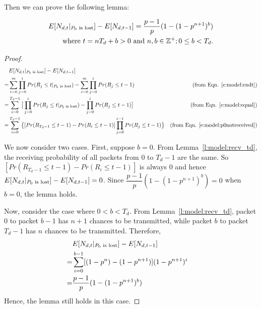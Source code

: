     Then we can prove the following lemma:
    \begin{lemma}
    \label{l:model:p0lost}
    \begin{eqnarray*}
    E[N_{d,t}|_{\textrm{$P_0$ is lost}}] - E[N_{d,t-1}] = \dfrac{p-1}{p}(1-(1-p^{n+1})^b) \\
    \textrm{where $t = nT_{d}+b > 0$ and $n,b \in\mathbb{Z^+}; 0 \le b<T_d$.}
    \end{eqnarray*}
    \end{lemma}
    \begin{proof}
    \begin{align*}
     &E[N_{d,t}|_{\textrm{$P_0$ is lost}}] - E[N_{d,t-1}] & \\
    =& \sum_{i=0}^{m}\prod_{j=0}^{i}Pr(R_{j} \le t|_{\textrm{$P_0$ is lost}}) - \sum_{i=0}^{m}\prod_{j=0}^{i}Pr(R_{j} \le t-1) & 
        \text{(from Eqn. \ref{e:model:endt})} \\
    =& \sum_{i=0}^{T_d - 1}\big[\prod_{j=0}^{i}Pr(R_{j} \le t|_{\textrm{$P_0$ is lost}}) - \prod_{j=0}^{i}Pr(R_{j} \le t-1)\big] &
        \text{(from Eqn. \ref{e:model:equal})}\\
    =& \sum_{i=0}^{T_d - 1}\big\{[Pr(R_{T_d-1} \le t-1) - Pr(R_{i} \le t-1)]\prod_{j=0}^{i-1}Pr(R_{j} \le t-1)\big\} 
        & \text{(from Eqn. \ref{e:model:p0notreceived})}\\
    \end{align*}

    We now consider two cases.  First, suppose $b = 0$.  From Lemma~\ref{l:model:recv_td}, the receiving probability of 
    all packets from 0 to $T_d - 1$ are the same. So $[Pr(R_{T_d-1} \leq t-1)
    - Pr(R_i \leq t-1)]$ is always 0 and hence $E[N_{d,t}|_{\textrm{$P_0$ is lost}}] - E[N_{d,t-1}] = 0$. 
    Since $\dfrac{p-1}{p}(1- (1-p^{n+1})^b) = 0$ when $b = 0$, the lemma holds.

    Now, consider the case where $0 < b < T_d$.
    From Lemma~\ref{l:model:recv_td}, packet $0$ to packet $b-1$ has $n+1$ chances to
    be transmitted, while packet $b$ to packet $T_d - 1$ has $n$ chances to
    be transmitted. Therefore, 
    \begin{align*}
     &E[N_{d,t}|_{\textrm{$P_0$ is lost}}] - E[N_{d,t-1}] & \\
    =&\sum_{i=0}^{b-1}[(1-p^{n})-(1-p^{n+1})](1-p^{n+1})^{i}\\
    =&\dfrac{p-1}{p}(1- (1-p^{n+1})^b) \\
    \end{align*}
    Hence, the lemma still holds in this case.
    \end{proof}
    
